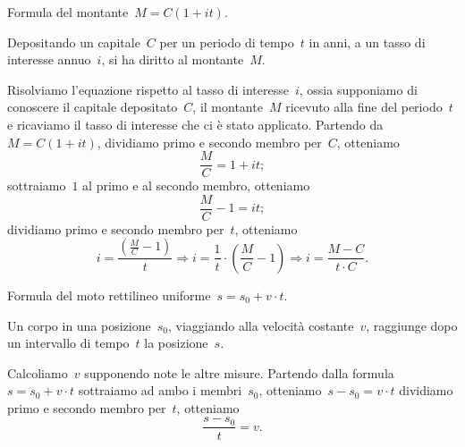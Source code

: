 \begin{esempio}{}{}
Formula del montante~\(M=C(1+it)\).

Depositando un capitale~\(C\) per un periodo di tempo~\(t\) in anni, a un 
tasso di 
interesse annuo~\(i\),
si ha diritto al montante~\(M\).

Risolviamo l'equazione rispetto al tasso di interesse~\(i\), ossia 
supponiamo di conoscere il capitale depositato~\(C\), il montante~\(M\)
ricevuto alla fine del periodo~\(t\) e ricaviamo il tasso di interesse 
che ci è stato applicato.
Partendo da~\(M=C(1+it)\), dividiamo primo e secondo membro per~\(C\), 
otteniamo 
\[\frac{M}{C}=1+it;\]
sottraiamo~\(1\) al primo e al secondo membro, otteniamo
\[\frac{M}{C}-1=it;\] dividiamo primo e secondo membro per~\(t\),
otteniamo
\[i=\frac{\left(\frac{M}{C}-1\right)}{t}\Rightarrow%
i=\frac{1}{t}\cdot \left(\frac{M}{C}-1\right)\Rightarrow 
i=\frac{M-C}{t\cdot C}.\]
\end{esempio}

\begin{esempio}{}{}
Formula del moto rettilineo uniforme~\(s=s_{0}+v\cdot t\).

Un corpo in una posizione~\(s_0\), viaggiando alla velocità costante~\(v\), 
raggiunge dopo un intervallo di tempo~\(t\) la posizione~\(s\).

Calcoliamo~\(v\) supponendo note le altre misure.
Partendo dalla formula~\(s=s_{0}+v\cdot t\) 
sottraiamo ad ambo i membri~\(s_0\), 
otteniamo~\(s-s_{0}=v\cdot t\)
dividiamo primo e secondo membro per~\(t\), otteniamo 
\[\frac{s-s_{0}}{t}=v.\]
\end{esempio}


% 


